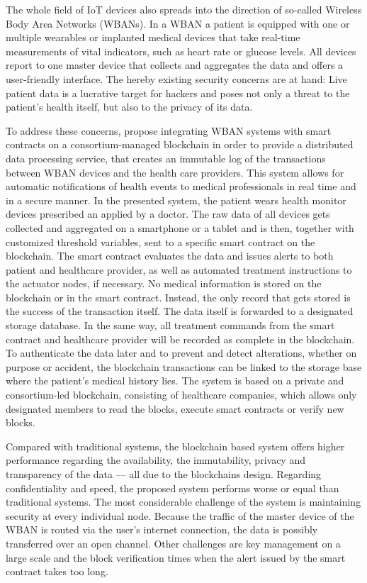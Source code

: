 The whole field of IoT devices also spreads into the direction of so-called Wireless Body Area Networks (WBANs). In a WBAN a patient is equipped with one or multiple wearables or implanted medical devices that take real-time measurements of vital indicators, such as heart rate or glucose levels. All devices report to one master device that collects and aggregates the data and offers a user-friendly interface.
The hereby existing security concerns are at hand: Live patient data is a lucrative target for hackers and poses not only a threat to the patient's health itself, but also to the privacy of its data.

To address these concerns, \citeauthor{Baccarini2018} propose integrating WBAN systems with smart contracts on a consortium-managed blockchain in order to provide a distributed data processing service, that creates an immutable log of the transactions between WBAN devices and the health care providers. This system allows for automatic notifications of health events to medical professionals in real time and in a secure manner.
In the presented system, the patient wears health monitor devices prescribed an applied by a doctor. The raw data of all devices gets collected and aggregated on a smartphone or a tablet and is then, together with customized threshold variables, sent to a specific smart contract on the blockchain. The smart contract evaluates the data and issues alerts to both patient and healthcare provider, as well as automated treatment instructions to the actuator nodes, if necessary.
No medical information is stored on the blockchain or in the smart contract. Instead, the only record that gets stored is the success of the transaction itself. The data itself is forwarded to a designated storage database. In the same way, all treatment commands from the smart contract and healthcare provider will be recorded as complete in the blockchain.
To authenticate the data later and to prevent and detect alterations, whether on purpose or accident, the blockchain transactions can be linked to the storage base where the patient's medical history lies.
The system is based on a private and consortium-led blockchain, consisting of healthcare companies, which allows only designated members to read the blocks, execute smart contracts or verify new blocks.

Compared with traditional systems, the blockchain based system offers higher performance regarding the availability, the immutability, privacy and transparency of the data — all due to the blockchains design. Regarding confidentiality and speed, the proposed system performs worse or equal than traditional systems.
The most considerable challenge of the system is maintaining security at every individual node. Because the traffic of the master device of the WBAN is routed via the user's internet connection, the data is possibly transferred over an open channel.  Other challenges are key management on a large scale and the block verification times when the alert issued by the smart contract takes too long.

